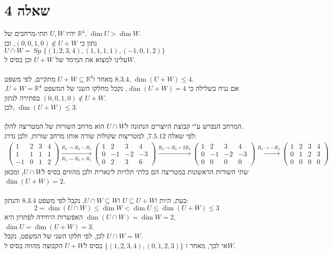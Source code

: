 \documentclass{article}
\DeclareMathOperator\Sp{Sp}
\def\reals{\mathbb{R}}
\begin{document}
\pagebreak

\section*{שאלה 4}

יהיו $U,W$ תתי-מרחבים של $\reals^4$, $\dim U>\dim W$. \\
נתון כי $(0,0,1,0)\notin U+W$, וכן $U\cap W=\Sp\{(1,2,3,4), (1,1,1,1), (-1,0,1,2)\}$ \\
עלינו למצוא את המימד של $U+W$ וכן בסיס ל$W$.
\\\\
מאחר ו$U+W\subseteq \reals^4$
מתקיים, לפי משפט $8.3.4$, $\dim(U+W)\leq 4$.\\
אם נניח בשלילה כי $\dim(U+W)=4$, נקבל מחלקו השני של המשפט $U+W=\reals^4$, בסתירה לנתון $(0,0,1,0)\notin U+W$.\\
לכן, $\dim(U+W)\leq 3$.
\\\\
המרחב הנפרש ע"י קבוצת היוצרים הנתונה ל$U\cap W$ הוא מרחב השורות של המטריצה להלן. \\
לפי שאלה $7.5.12$, למטריצות שקולות שורה אותו מרחב שורות, ולכן נדרג:
\begin{align*}
    \begin{pmatrix}
        1  & 2 & 3 & 4 \\
        1  & 1 & 1 & 1 \\
        -1 & 0 & 1 & 2
    \end{pmatrix}
    \xrightarrow[R_3\rightarrow R_3+R_1]{R_2\rightarrow R_2-R_1}
    \begin{pmatrix}
        1 & 2  & 3  & 4  \\
        0 & -1 & -2 & -3 \\
        0 & 2  & 3  & 6
    \end{pmatrix}
    \xrightarrow[]{R_3\rightarrow R_3+2R_2}
    \begin{pmatrix}
        1 & 2  & 3  & 4  \\
        0 & -1 & -2 & -3 \\
        0 & 0  & 0  & 0
    \end{pmatrix}
    \xrightarrow[]{R_2\rightarrow -R_2}
    \begin{pmatrix}
        1 & 2 & 3 & 4 \\
        0 & 1 & 2 & 3 \\
        0 & 0 & 0 & 0
    \end{pmatrix}
\end{align*}
שתי השורות הראשונות במטריצה הם בלתי תלויות לינארית ולכן מהווים בסיס ל$U\cap W$, ומכאן $\dim(U+W)=2$.
\\\\
כעת, היות ו$U\subseteq U+W$ ו$U\cap W\subseteq W$, נקבל לפי משפט 8.3.4 והנתון:
\[
    2=\dim(U\cap W)\leq \dim W < \dim U \leq \dim (U+W)\leq 3
\]
האפשרות היחידה לפתרון היא $\dim(U\cap W)=\dim W=2$, $\dim U = \dim(U+W)=3$. \\
לכן, לפי חלקו השני של המשפט, נקבל $U\cap W = W$. \\
אי לכך, מאחר ו $\{(1,2,3,4), (0,1,2,3)\}$ בסיס ל$U+W$ הקבוצה מהווה בסיס ל$W$.
\end{document}
